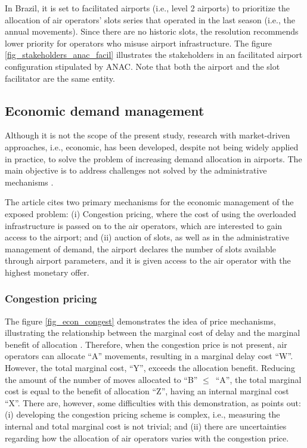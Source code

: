  In Brazil, it is set to facilitated airports (i.e., level 2 airports) to prioritize the allocation of air operators’ slots series that operated in the last season (i.e., the annual movements). Since there are no historic slots, the resolution recommends lower priority for operators who misuse airport infrastructure. The figure \ref{fig_stakeholders_anac_facil} illustrates the stakeholders in an facilitated airport configuration stipulated by \acrshort{ANAC}. Note that both the airport and the slot facilitator are the same entity.


 \subsection{Economic demand management}
Although it is not the scope of the present study, research with market-driven approaches, i.e., economic, has been developed, despite not being widely applied in practice, to solve the problem of increasing demand allocation in airports. The main objective is to address challenges not solved by the administrative mechanisms \cite{ball2006auctions}.

The article \cite{gillen2016airport} cites two primary mechanisms for the economic management of the exposed problem: (i) Congestion pricing, where the cost of using the overloaded infrastructure is passed on to the air operators, which are interested to gain access to the airport; and (ii) auction of slots, as well as in the administrative management of demand, the airport declares the number of slots available through airport parameters, and it is given access to the air operator with the highest monetary offer.

\subsubsection{Congestion pricing}

The figure \ref{fig_econ_congest} demonstrates the idea of price mechanisms, illustrating the relationship between the marginal cost of delay and the marginal benefit of allocation \cite{gillen2016airport}. Therefore, when the congestion price is not present, air operators can allocate “A” movements, resulting in a marginal delay cost “W”. However, the total marginal cost, “Y”, exceeds the allocation benefit. Reducing the amount of the number of moves allocated to “B” $\le$\ “A”, the total marginal cost is equal to the benefit of allocation “Z”, having an internal marginal cost “X”. There are, however, some difficulties with this demonstration, as \cite{gillen2016airport} points out: (i) developing the congestion pricing scheme is complex, i.e., measuring the internal and total marginal cost is not trivial; and (ii) there are uncertainties regarding how the allocation of air operators varies with the congestion price.

